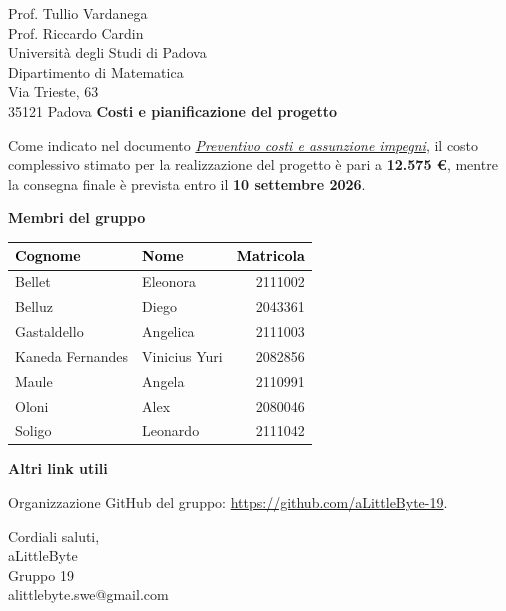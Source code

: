\documentclass[a4paper,11pt]{letter}
\makeatletter
\newcommand{\GruppoFirma}{aLittleByte\\Gruppo 19\\alittlebyte.swe@gmail.com}
\makeatother
\begin{document}
\begin{letter}{Prof. Tullio Vardanega\\Prof. Riccardo Cardin\\Università degli Studi di Padova\\Dipartimento di Matematica\\Via Trieste, 63\\35121 Padova}
  \textbf{Costi e pianificazione del progetto}

  Come indicato nel documento \href{https://alittlebyte-19.github.io/Documentazione/candidatura/Dichiarazione%20Impegni/Preventivo%20costi%20e%20assunzione%20impegni.pdf}{\textit{Preventivo costi e assunzione impegni}},
  il costo complessivo stimato per la realizzazione del progetto è pari a
  \textbf{12.575 \euro{}}, mentre la consegna finale è prevista entro il
  \textbf{10 settembre 2026}.

  \vspace{1em}

  \textbf{Membri del gruppo}
  \begin{center}
  \setlength{\arrayrulewidth}{0.8pt}
  \begin{tabular}{|l|l|r|}
  \hline
  \rowcolor{primarycolor!20}
  \textcolor{black}{\textbf{Cognome}} & \textcolor{black}{\textbf{Nome}} & \textcolor{black}{\textbf{Matricola}} \\
  \hline
  Bellet & Eleonora & 2111002\\
  \hline
  Belluz & Diego & 2043361\\
  \hline
  Gastaldello & Angelica & 2111003\\
  \hline
  Kaneda Fernandes & Vinicius Yuri & 2082856 \\
  \hline
  Maule & Angela & 2110991\\
  \hline
  Oloni & Alex & 2080046\\
  \hline
  Soligo & Leonardo & 2111042\\
  \hline
  \end{tabular}
  \end{center}

  \vspace{0.8em}

  \textbf{Altri link utili}

  Organizzazione GitHub del gruppo: \href{https://github.com/aLittleByte-19}{https://github.com/aLittleByte-19}.

  \vspace{1.2em}

  \closing{Cordiali saluti, \vspace{1.2em} \\ \GruppoFirma}

  \end{letter}

  
\end{document}
